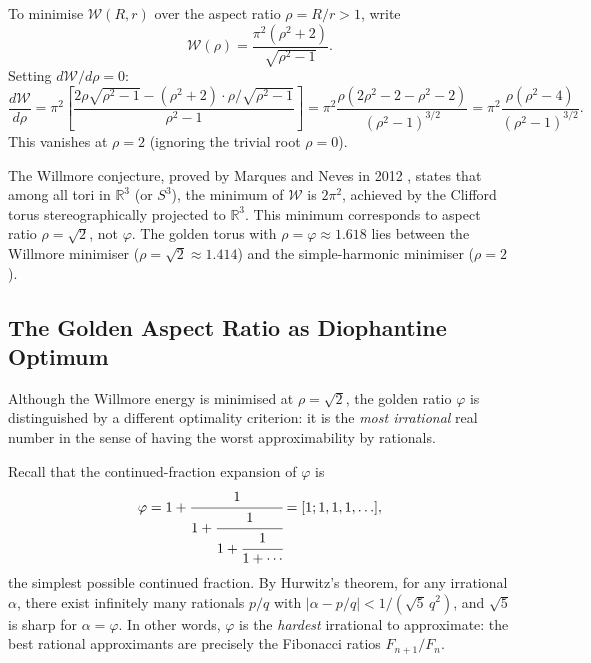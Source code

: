 To minimise $\mathcal{W}(R,r)$ over the aspect ratio $\rho = R/r > 1$, write
\begin{equation}\label{eq:willmore-rho}
  \mathcal{W}(\rho) = \frac{\pi^2(\rho^2+2)}{\sqrt{\rho^2-1}}.
\end{equation}
Setting $d\mathcal{W}/d\rho = 0$:
\begin{equation}
  \frac{d\mathcal{W}}{d\rho} = \pi^2\left[\frac{2\rho\sqrt{\rho^2-1} - (\rho^2+2)\cdot\rho/\sqrt{\rho^2-1}}{\rho^2-1}\right]
  = \pi^2 \frac{\rho(2\rho^2 - 2 - \rho^2 - 2)}{(\rho^2-1)^{3/2}}
  = \pi^2 \frac{\rho(\rho^2 - 4)}{(\rho^2-1)^{3/2}}.
\end{equation}
This vanishes at $\rho = 2$ (ignoring the trivial root $\rho = 0$).

\begin{remark}[Willmore conjecture and $\rho = \sqrt{2}$]
The Willmore conjecture, proved by Marques and Neves in 2012 \cite{MarquesNeves2014},
states that among all tori in $\mathbb{R}^3$ (or $S^3$), the minimum of $\mathcal{W}$ is
$2\pi^2$, achieved by the Clifford torus stereographically projected to $\mathbb{R}^3$.
This minimum corresponds to aspect ratio $\rho = \sqrt{2}$, not $\varphi$.
The golden torus with $\rho = \varphi \approx 1.618$ lies between the Willmore
minimiser ($\rho = \sqrt{2} \approx 1.414$) and the simple-harmonic minimiser ($\rho = 2$).
\end{remark}

\subsection{The Golden Aspect Ratio as Diophantine Optimum}\label{subsec:ch18-diophantine}

Although the Willmore energy is minimised at $\rho = \sqrt{2}$, the golden ratio
$\varphi$ is distinguished by a different optimality criterion: it is the
\emph{most irrational} real number in the sense of having the worst approximability
by rationals.

Recall that the continued-fraction expansion of $\varphi$ is
\begin{equation}\label{eq:phi-cf}
  \varphi = 1 + \cfrac{1}{1 + \cfrac{1}{1 + \cfrac{1}{1 + \cdots}}} = [1;1,1,1,\ldots],
\end{equation}
the simplest possible continued fraction.
By Hurwitz's theorem, for any irrational $\alpha$, there exist infinitely many rationals
$p/q$ with $|\alpha - p/q| < 1/(\sqrt{5}\, q^2)$, and $\sqrt{5}$ is sharp for $\alpha = \varphi$.
In other words, $\varphi$ is the \emph{hardest} irrational to approximate: the best
rational approximants are precisely the Fibonacci ratios $F_{n+1}/F_n$.

